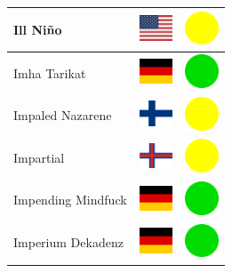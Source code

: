 \documentclass[12pt, a4paper, twoside]{report}
\begin{document}
\begin{center}
\begin{longtable}{|p{5cm}|p{2cm}|p{2cm}|}
 Ill Niño                                                   & \includegraphics[width=1cm]{../4x3/us} &   \includegraphics[width=1cm]{../likes/m} \\ \hline
 Imha Tarikat                                               & \includegraphics[width=1cm]{../4x3/de} &   \includegraphics[width=1cm]{../likes/y} \\ \hline
 Impaled Nazarene                                           & \includegraphics[width=1cm]{../4x3/fi} &   \includegraphics[width=1cm]{../likes/m} \\ \hline
 Impartial                                                  & \includegraphics[width=1cm]{../4x3/fo} &   \includegraphics[width=1cm]{../likes/m} \\ \hline
 Impending Mindfuck                                         & \includegraphics[width=1cm]{../4x3/de} &   \includegraphics[width=1cm]{../likes/y} \\ \hline
 Imperium Dekadenz                                          & \includegraphics[width=1cm]{../4x3/de} &   \includegraphics[width=1cm]{../likes/y} \\ \hline

\end{longtable}
\end{center}
\end{document}
